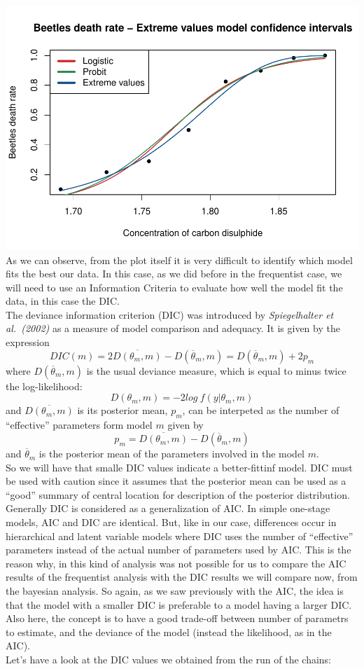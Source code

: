 \documentclass[]{article}
\begin{document}
\includegraphics{FinalProject-SDSII_files/figure-latex/unnamed-chunk-33-1.pdf}
As we can observe, from the plot itself it is very difficult to identify
which model fits the best our data. In this case, as we did before in
the frequentist case, we will need to use an Information Criteria to
evaluate how well the model fit the data, in this case the DIC.\\
The deviance information criterion (DIC) was introduced by
\emph{Spiegelhalter et al.~(2002)} as a measure of model comparison and
adequacy. It is given by the expression
\[DIC(m) = 2\overline{D(\theta_m,m)} - D(\overline{\theta}_m,m) = D(\overline{\theta}_m,m) + 2p_m\]
where \(D(\overline{\theta}_m,m)\) is the usual deviance measure, which
is equal to minus twice the log-likelihood:
\[D(\theta_m,m) = -2log \:f(y|\theta_m, m)\] and
\(\overline{D(\theta_m,m)}\) is its posterior mean, \(p_m\), can be
interpeted as the number of ``effective'' parameters form model \(m\)
given by \[p_m = \overline{D(\theta_m,m)} -  D(\overline{\theta}_m,m)\]
and \(\overline{\theta}_m\) is the posterior mean of the parameters
involved in the model \(m\).\\
So we will have that smalle DIC values indicate a better-fittinf model.
DIC must be used with caution since it assumes that the posterior mean
can be used as a ``good'' summary of central location for description of
the posterior distribution.\\
Generally DIC is considered as a generalization of AIC. In simple
one-stage models, AIC and DIC are identical. But, like in our case,
differences occur in hierarchical and latent variable models where DIC
uses the number of ``effective'' parameters instead of the actual number
of parameters used by AIC. This is the reason why, in this kind of
analysis was not possible for us to compare the AIC results of the
frequentist analysis with the DIC results we will compare now, from the
bayesian analysis. So again, as we saw previously with the AIC, the idea
is that the model with a smaller DIC is preferable to a model having a
larger DIC. Also here, the concept is to have a good trade-off between
number of parametrs to estimate, and the deviance of the model (instead
the likelihood, as in the AIC).\\
Let's have a look at the DIC values we obtained from the run of the
chains:
\end{document}

